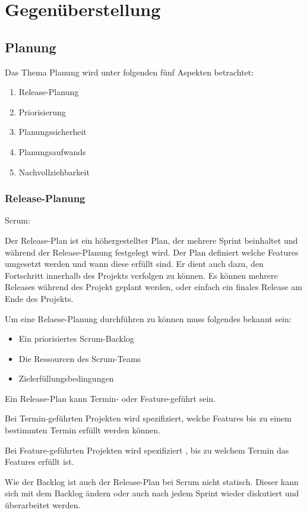 \chapter{Gegenüberstellung}
\thispagestyle{fancy}
\section{Planung}

Das Thema Planung wird unter folgenden fünf Aspekten betrachtet:
\begin{enumerate}
\item Release-Planung
\item Priorisierung
\item Planungssicherheit
\item Planungsaufwands
\item Nachvollziehbarkeit
\end{enumerate}

\subsection{Release-Planung}

{\Large Scrum:} \cite{planningReleaseScrum} \medskip

Der Release-Plan ist ein höhergestellter Plan, der mehrere Sprint beinhaltet und während der Release-Planung festgelegt wird. Der Plan definiert welche Features umgesetzt werden und wann diese erfüllt sind. Er dient auch dazu, den Fortschritt innerhalb des Projekts verfolgen zu können. Es können mehrere Releases während des Projekt geplant werden, oder einfach ein finales Release am Ende des Projekts. \medskip

Um eine Relaese-Planung durchführen zu können muss folgendes bekannt sein:
\begin{itemize}
\item Ein priorisiertes Scrum-Backlog
\item Die Ressourcen des Scrum-Teams
\item Zielerfüllungsbedingungen
\end{itemize}
Ein Release-Plan kann Termin- oder Feature-geführt sein.\smallskip

Bei Termin-geführten Projekten wird spezifiziert, welche Features bis zu einem bestimmten Termin erfüllt werden können.\smallskip

Bei Feature-geführten Projekten wird spezifiziert , bis zu welchem Termin das Features erfüllt ist.\smallskip

Wie der Backlog ist auch der Release-Plan bei Scrum nicht statisch. Dieser kann sich mit dem Backlog ändern oder auch nach jedem Sprint wieder diskutiert und überarbeitet werden.
\bigskip 

